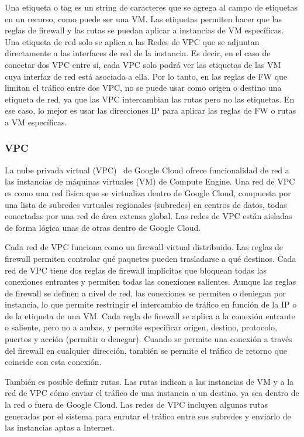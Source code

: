     Una etiqueta o tag es un string de caracteres que se agrega al campo de etiquetas en un recurso, como puede ser una VM. Las etiquetas permiten hacer que las reglas de firewall y las rutas se puedan aplicar a instancias de VM específicas. Una etiqueta de red solo se aplica a las Redes de VPC que se adjuntan directamente a las interfaces de red de la instancia. Es decir, en el caso de conectar dos VPC entre sí, cada VPC solo podrá ver las etiquetas de las VM cuya interfaz de red está asociada a ella. Por lo tanto, en las reglas de FW que limitan el tráfico entre dos VPC, no se puede usar como origen o destino una etiqueta de red, ya que las VPC intercambian las rutas pero no las etiquetas. En ese caso, lo mejor es usar las direcciones IP para aplicar las reglas de FW o rutas a VM específicas.

\subsubsection{VPC}
    La nube privada virtual (VPC)~\cite{cloud3} de Google Cloud ofrece funcionalidad de red a las instancias de máquinas virtuales (VM) de Compute Engine. Una red de VPC es como una red física que se virtualiza dentro de Google Cloud, compuesta por una lista de subredes virtuales regionales (subredes) en centros de datos, todas conectadas por una red de área extensa global. Las redes de VPC están aisladas de forma lógica unas de otras dentro de Google Cloud.

    Cada red de VPC funciona como un firewall virtual distribuido. Las reglas de firewall permiten controlar qué paquetes pueden trasladarse a qué destinos. Cada red de VPC tiene dos reglas de firewall implícitas que bloquean todas las conexiones entrantes y permiten todas las conexiones salientes. Aunque las reglas de firewall se definen a nivel de red, las conexiones se permiten o deniegan por instancia, lo que permite restringir el intercambio de tráfico en función de la IP o de la etiqueta de una VM. Cada regla de firewall se aplica a la conexión entrante o saliente, pero no a ambas, y permite especificar origen, destino, protocolo, puertos y acción (permitir o denegar). Cuando se permite una conexión a través del firewall en cualquier dirección, también se permite el tráfico de retorno que coincide con esta conexión.

    También es posible definir rutas. Las rutas indican a las instancias de VM y a la red de VPC cómo enviar el tráfico de una instancia a un destino, ya sea dentro de la red o fuera de Google Cloud. Las redes de VPC incluyen algunas rutas generadas por el sistema para enrutar el tráfico entre sus subredes y enviarlo de las instancias aptas a Internet.


